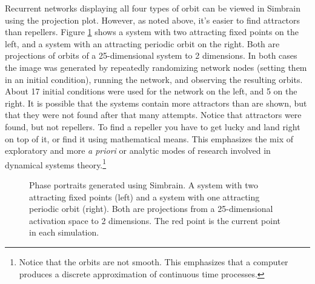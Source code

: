 Recurrent networks displaying all four types of orbit can be viewed in Simbrain using the projection plot. However, as noted above, it's easier to find attractors than repellers. Figure \ref{F:simbrainStateSpace} shows a system with two attracting fixed points on the left, and a system with an attracting periodic orbit on the right. Both are projections of orbits of a 25-dimensional system to 2 dimensions. In both cases the image was generated by repeatedly randomizing network nodes (setting them in an initial condition), running the network, and observing the resulting orbits. About 17 initial conditions were used for the network on the left, and 5 on the right. It is possible that the systems contain more attractors than are shown, but that they were not found after that many attempts. Notice that attractors were found, but not repellers. To find a repeller you have to get lucky and land right on top of it, or find it using mathematical means. This emphasizes the mix of exploratory and more \emph{a priori} or analytic modes of research involved in dynamical systems theory.\footnote{Notice that the orbits are not smooth. This emphasizes that a computer produces a discrete approximation of continuous time processes.}

\begin{figure}[h]
\centering
{}
\hspace*{.5 in}
\caption[Simbrain screenshots.]{Phase portraits generated using Simbrain. A system with two attracting fixed points (left) and a system with one attracting periodic orbit (right). Both are projections from a 25-dimensional activation space to 2 dimensions. The red point is the current point in each simulation. }
\label{F:simbrainStateSpace}
\end{figure}
